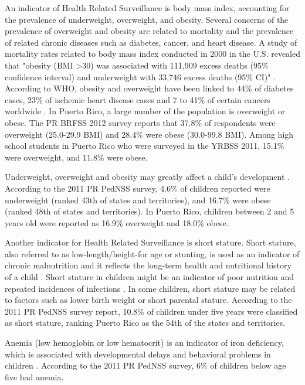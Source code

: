 \documentclass[12pt,letterpaper]{report}
\begin{document}
An indicator of Health Related Surveillance is body mass index, accounting for the prevalence of underweight, overweight, and obesity. Several concerns of the prevalence of overweight and obesity are related to mortality and the prevalence of related chronic diseases such as diabetes, cancer, and heart disease. A study of mortality rates related to body mass index conducted in 2000 in the U.S. revealed that "obesity (BMI \textgreater 30) was associated with 111,909 excess deaths (95\% confidence interval) and underweight with 33,746 excess deaths (95\% CI)" \cite{flegal2005excess}. According to WHO, obesity and overweight have been linked to 44\% of diabetes cases, 23\% of ischemic heart disease cases and 7 to 41\% of certain cancers worldwide \cite{mathers2009global}. In Puerto Rico, a large number of the population is overweight or obese. The PR BRFSS 2012 survey reports that 37.8\% of respondents were overweight (25.0-29.9 BMI) and 28.4\% were obese (30.0-99.8 BMI). Among high school students in Puerto Rico who were surveyed in the YRBSS 2011, 15.1\% were overweight, and 11.8\% were obese. 

Underweight, overweight and obesity may greatly affect a child's development \cite{black2008maternal}. According to the 2011 PR PedNSS survey, 4.6\% of children reported were underweight (ranked 43th of states and territories), and 16.7\% were obese (ranked 48th of states and territories). In Puerto Rico, children between 2 and 5 years old were reported as 16.9\% overweight and 18.0\% obese.

Another indicator for Health Related Surveillance is short stature. Short stature, also referred to as low-length/height-for age or stunting, is used as an indicator of chronic malnutrition and it reflects the long-term health and nutritional history of a child \cite{world1995physical}. Short stature in children might be an indicator of poor nutrition and repeated incidences of infections \cite{black2008maternal, uauy2008nutrition, stephenson2000malnutrition, oberhelman1998correlations, stephenson1994helminth}. In some children, short stature may be related to factors such as lower birth weight or short parental stature. According to the 2011 PR PedNSS survey report, 10.8\% of children under five years were classified as short stature, ranking Puerto Rico as the 54th of the states and territories. 

Anemia (low hemoglobin or low hematocrit) is an indicator of iron deficiency, which is associated with developmental delays and behavioral problems in children \cite{idjradinata1993reversal}. According to the 2011 PR PedNSS survey, 6\% of children below age five had anemia.
\end{document}
